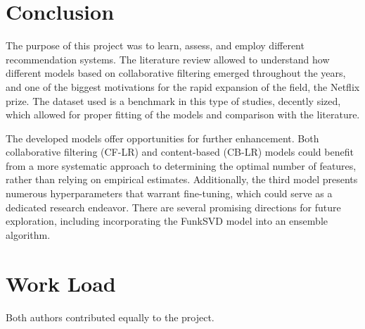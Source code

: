 \documentclass[conference]{IEEEtran}
\begin{document}
\section{Conclusion}

The purpose of this project was to learn, assess, and employ different recommendation systems. The literature review allowed to understand how different models based on collaborative filtering emerged throughout the years, and one of the biggest motivations for the rapid expansion of the field, the Netflix prize. The dataset used is a benchmark in this type of studies, decently sized, which allowed for proper fitting of the models and comparison with the literature.

The developed models offer opportunities for further enhancement. Both collaborative filtering (CF-LR) and content-based (CB-LR) models could benefit from a more systematic approach to determining the optimal number of features, rather than relying on empirical estimates. Additionally, the third model presents numerous hyperparameters that warrant fine-tuning, which could serve as a dedicated research endeavor. There are several promising directions for future exploration, including incorporating the FunkSVD model into an ensemble algorithm.


\section*{Work Load}

Both authors contributed equally to the project.



\end{document}

